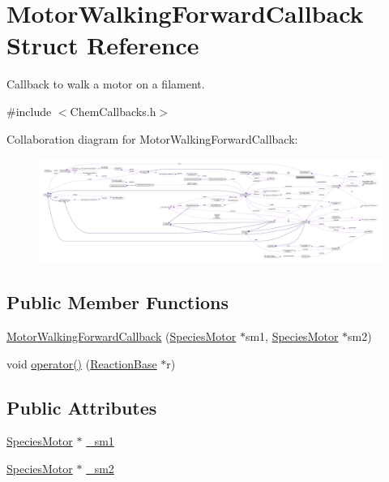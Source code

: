 \hypertarget{structMotorWalkingForwardCallback}{\section{Motor\+Walking\+Forward\+Callback Struct Reference}
\label{structMotorWalkingForwardCallback}
}


Callback to walk a motor on a filament.  




{\ttfamily \#include $<$Chem\+Callbacks.\+h$>$}



Collaboration diagram for Motor\+Walking\+Forward\+Callback\+:\nopagebreak
\begin{figure}[H]
\begin{center}
\leavevmode
\includegraphics[width=350pt]{structMotorWalkingForwardCallback__coll__graph}
\end{center}
\end{figure}
\subsection*{Public Member Functions}
\begin{DoxyCompactItemize}
\item 
\hyperlink{structMotorWalkingForwardCallback_a9d977663ec46a938ca8de651afb7115e}{Motor\+Walking\+Forward\+Callback} (\hyperlink{classSpeciesMotor}{Species\+Motor} $\ast$sm1, \hyperlink{classSpeciesMotor}{Species\+Motor} $\ast$sm2)
\item 
void \hyperlink{structMotorWalkingForwardCallback_af140a2c836e0e5e96fb9196a47ca8e95}{operator()} (\hyperlink{classReactionBase}{Reaction\+Base} $\ast$r)
\end{DoxyCompactItemize}
\subsection*{Public Attributes}
\begin{DoxyCompactItemize}
\item 
\hyperlink{classSpeciesMotor}{Species\+Motor} $\ast$ \hyperlink{structMotorWalkingForwardCallback_abd0c24b9f2cda56144f9fec0421e3c42}{\+\_\+sm1}
\item 
\hyperlink{classSpeciesMotor}{Species\+Motor} $\ast$ \hyperlink{structMotorWalkingForwardCallback_a1c1d1deb98e90fd90f57791705152873}{\+\_\+sm2}
\end{DoxyCompactItemize}


